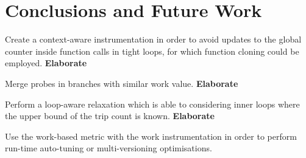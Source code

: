 \chapter{Conclusions and Future Work}



Create a context-aware instrumentation in order to avoid updates to the global counter inside function calls in tight loops, for which function cloning could be employed.
\textbf{Elaborate}

Merge probes in branches with similar work value.
\textbf{Elaborate}

Perform a loop-aware relaxation which is able to considering inner loops where the upper bound of the trip count is known.
\textbf{Elaborate}

Use the work-based metric with the work instrumentation in order to perform run-time auto-tuning or multi-versioning optimisations.

